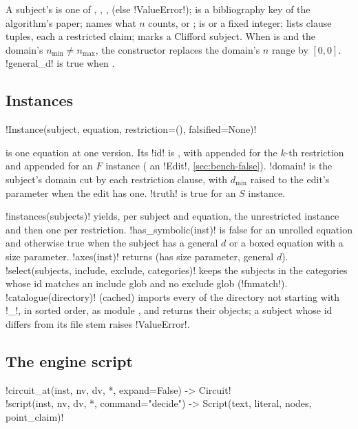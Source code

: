 A subject's  is one of , , ,
 (else \py!ValueError!);  is a bibliography key of the algorithm's
paper;  names what $n$ counts, or ;  is
 or a fixed integer;  lists clause tuples, each a restricted
claim;  marks a Clifford subject. When  is  and
the domain's $n_{\min}\neq n_{\max}$, the constructor replaces the domain's $n$ range by
$[0,0]$. \py!general_d! is true when .

\subsection{Instances}

\begin{signature}
\py!Instance(subject, equation, restriction=(), falsified=None)!
\end{signature}
\noindent is one equation at one version. Its \py!id! is , with
 appended for the $k$-th restriction and \code{!} appended for an $F$ instance
( an \py!Edit!, \cref{sec:bench-false}). \py!domain! is the subject's domain cut
by each restriction clause, with $d_{\min}$ raised to the edit's parameter  when the
edit has one. \py!truth! is true for an $S$ instance.

\py!instances(subjects)! yields, per subject and equation, the unrestricted instance and then one
per restriction. \py!has_symbolic(inst)! is false for an unrolled equation and otherwise true when
the subject has a general $d$ or a boxed equation with a size parameter. \py!axes(inst)! returns
(has size parameter, general $d$). \py!select(subjects, include, exclude, categories)! keeps the
subjects in the categories whose id matches an include glob and no exclude glob
(\py!fnmatch!). \py!catalogue(directory)! (cached) imports every  of the directory not
starting with \code!_!, in sorted order, as module , and
returns their  objects; a subject whose id differs from its file stem raises
\py!ValueError!.

\subsection{The engine script}

\begin{signature}
\py!circuit_at(inst, nv, dv, *, expand=False) -> Circuit!\\
\py!script(inst, nv, dv, *, command="decide") -> Script(text, literal, nodes, point_claim)!
\end{signature}

